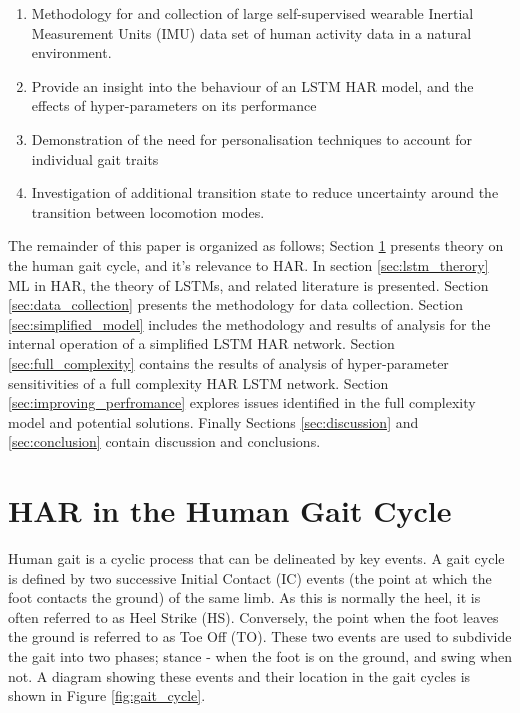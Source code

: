 \documentclass[sensors,article,submit,moreauthors,pdftex]{Definitions/mdpi}
\begin{document}
\begin{enumerate}
\item Methodology for and collection of large self-supervised wearable Inertial Measurement Units (IMU) data set of human activity data in a natural environment.
\item Provide an insight into the behaviour of an LSTM HAR model, and the effects of hyper-parameters on its performance
\item Demonstration of the need for personalisation techniques to account for individual gait traits
\item Investigation of additional transition state to reduce uncertainty around the transition between locomotion modes.
\end{enumerate}

The remainder of this paper is organized as follows; Section \ref{sec:human_gait_cycle} presents theory on the human gait cycle, and it's relevance to HAR. In section \ref{sec:lstm_therory} ML in HAR, the theory of LSTMs, and related literature is presented. Section \ref{sec:data_collection} presents the methodology for data collection. Section \ref{sec:simplified_model} includes the methodology and results of analysis for the internal operation of a simplified LSTM HAR network. Section \ref{sec:full_complexity} contains the results of analysis of hyper-parameter sensitivities of a full complexity HAR LSTM network. Section \ref{sec:improving_perfromance} explores issues identified in the full complexity model and potential solutions. Finally Sections \ref{sec:discussion} and \ref{sec:conclusion} contain discussion and conclusions.




\section{HAR in the Human Gait Cycle}
\label{sec:human_gait_cycle}
Human gait is a cyclic process that can be delineated by key events. A gait cycle is defined by two successive Initial Contact (IC) events (the point at which the foot contacts the ground) of the same limb. As this is normally the heel, it is often referred to as Heel Strike (HS). Conversely, the point when the foot leaves the ground is referred to as Toe Off (TO). These two events are used to subdivide the gait into two phases; stance - when the foot is on the ground, and swing when not. A diagram showing these events and their location in the gait cycles is shown in Figure \ref{fig:gait_cycle}.
\end{document}
